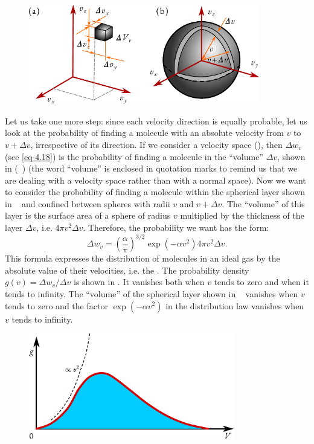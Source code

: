 	
\begin{figure}[!ht]
\centering
\includegraphics[width=0.9\textwidth]{figures/velspace.pdf}
\end{figure}
Let us take one more step: since each velocity direction is equally probable, let us look at the probability of finding a molecule with an absolute	velocity from $v$ to $v + \Delta v$,	irrespective of	its direction. If	we consider a velocity space (), then $\Delta w_{v}$ (see \eqref{eq-4.18}) is the probability of finding a molecule in the ``volume'' $\Delta v$, shown in (~) (the word ``volume'' is enclosed in quotation marks to remind us that we are dealing with a velocity space rather than with a normal space). Now we want to consider the probability of finding a molecule within the spherical layer shown in ~ and confined between spheres with radii $v$ and $v + \Delta v$. The ``volume'' of this layer is the surface area of a sphere of radius $v$ multiplied by the thickness of the layer $\Delta v$, i.e. $4 \pi v^{2} \Delta v$. Therefore, the probability we want has the form:
\begin{equation}%
\Delta w_{v}  = \left(\frac{\alpha}{\pi} \right) ^{3/2} \exp (- \alpha v^{2})  4 \pi v^{2} \Delta v.
\label{eq-4.19}
\end{equation}
This formula expresses the distribution of molecules in an ideal gas by the absolute value of their velocities, i.e. the . The probability density $g (v) = \Delta w_{v} / \Delta v$ is shown in . It vanishes both when $v$ tends to zero and when it tends to infinity. The ``volume'' of the spherical layer shown in ~ vanishes when $v$ tends to zero and the factor $\exp(- \alpha v^{2})$ in the distribution law vanishes when $v$ tends to infinity.
\begin{figure}[!ht]
\centering
\includegraphics[width=0.8\textwidth]{figures/dist2.pdf}
\end{figure}

